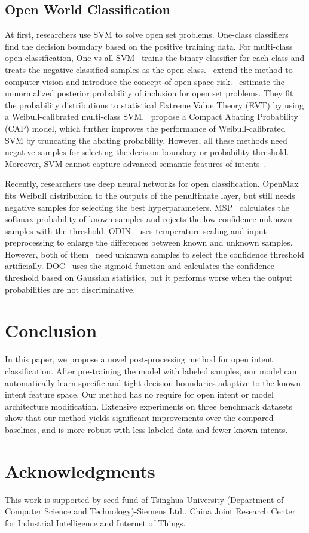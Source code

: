 \documentclass[letterpaper]{article} \usepackage{aaai21}  \usepackage{times}  \usepackage{helvet} \usepackage{courier}  \usepackage[hyphens]{url}  \usepackage{graphicx} \urlstyle{rm} \def\UrlFont{\rm}  \usepackage{natbib}  \usepackage{caption} \frenchspacing  \setlength{\pdfpagewidth}{8.5in}  \setlength{\pdfpageheight}{11in}  \usepackage{amsmath}
\begin{document}
	\subsection{Open World Classification}
	At first, researchers use SVM to solve open set problems. One-class classifiers~\cite{scholkopf2001estimating,SVDD} find the decision boundary based on the positive training data. For multi-class open classification, One-vs-all SVM~\cite{Rifkin2004In} trains the binary classifier for each class and treats the negative classified samples as the open class.~\citet{scheirer2013toward} extend the method to computer vision and introduce the concept of open space risk.~\citet{Jain_2014_ECCV} estimate the unnormalized posterior probability of inclusion for open set problems. They fit the probability distributions to statistical Extreme Value Theory (EVT) by using a Weibull-calibrated multi-class SVM.~\citet{Scheirer_2014_TPAMIb} propose a Compact Abating Probability (CAP) model, which further improves the performance of Weibull-calibrated SVM by truncating the abating probability. However, all these methods need negative samples for selecting the decision boundary or probability threshold. Moreover, SVM cannot capture  advanced semantic features of intents~\cite{lin2019post}.
	
	Recently, researchers use deep neural networks for open classification. OpenMax~\cite{bendale2016towards} fits Weibull distribution to the outputs of the penultimate layer, but still needs negative samples for selecting the best hyperparameters. MSP~\cite{hendrycks17baseline} calculates the softmax probability of known samples and rejects the low confidence unknown samples with the threshold. ODIN~\cite{liang2018enhancing} uses temperature scaling and input preprocessing to enlarge the differences between known and unknown samples. However, both of them~\cite{hendrycks17baseline,liang2018enhancing} need unknown samples to select the confidence threshold  artificially. DOC~\cite{Shu2017DOCDO} uses the sigmoid function and calculates the confidence threshold based on Gaussian statistics, but it performs worse when the output probabilities are not discriminative. 
	
	\section{Conclusion}
	In this paper, we propose a novel post-processing method for open intent classification. After pre-training the model with labeled samples, our model can automatically learn specific and tight decision boundaries adaptive to the known intent feature space. Our method has no require for open intent or model architecture modification. Extensive experiments on three benchmark datasets show that our method yields significant improvements over the compared baselines, and is more robust with less labeled data and fewer known intents.
	
	\section{Acknowledgments}
	This work is supported by seed fund of Tsinghua University (Department of Computer Science and Technology)-Siemens Ltd., China Joint Research Center for Industrial Intelligence and Internet of Things. 
	
	
\end{document}
